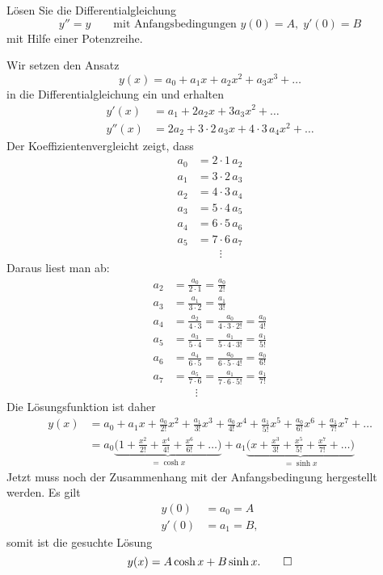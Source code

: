 Lösen Sie die Differentialgleichung
\[
y''=y\qquad\text{mit Anfangsbedingungen $y(0)=A,\;y'(0)=B$}
\]
mit Hilfe einer Potenzreihe.

\begin{loesung}
Wir setzen den Ansatz
\[
y(x)
=
a_0+a_1x+a_2x^2+a_3x^3+\dots
\]
in die Differentialgleichung ein und erhalten
\begin{align*}
y'(x)
&=
a_1+2a_2x+3a_3x^2+\dots
\\
y''(x)
&=
2a_2 + 3\cdot 2\,a_3x + 4\cdot 3\,a_4x^2+\dots
\end{align*}
Der Koeffizientenvergleicht zeigt, dass 
\begin{align*}
a_0&=2\cdot 1\,a_2\\
a_1&=3\cdot 2\,a_3\\
a_2&=4\cdot 3\,a_4\\
a_3&=5\cdot 4\,a_5\\
a_4&=6\cdot 5\,a_6\\
a_5&=7\cdot 6\,a_7\\
   &\qquad\vdots
\end{align*}
Daraus liest man ab:
\begin{align*}
a_2&=\frac{a_0}{2\cdot 1}=\frac{a_0}{2!}\\
a_3&=\frac{a_1}{3\cdot 2}=\frac{a_1}{3!}\\
a_4&=\frac{a_2}{4\cdot 3}=\frac{a_0}{4\cdot 3\cdot 2!}=\frac{a_0}{4!}\\
a_5&=\frac{a_3}{5\cdot 4}=\frac{a_1}{5\cdot 4\cdot 3!}=\frac{a_1}{5!}\\
a_6&=\frac{a_4}{6\cdot 5}=\frac{a_0}{6\cdot 5\cdot 4!}=\frac{a_0}{6!}\\
a_7&=\frac{a_5}{7\cdot 6}=\frac{a_1}{7\cdot 6\cdot 5!}=\frac{a_1}{7!}\\
   &\qquad\vdots
\end{align*}
Die Lösungsfunktion ist daher
\begin{align*}
y(x)
&=
a_0 + a_1x + \frac{a_0}{2!}x^2 + \frac{a_1}{3!}x^3+\frac{a_0}{4!}x^4
+ \frac{a_1}{5!}x^5+\frac{a_0}{6!}x^6 + \frac{a_1}{7!}x^7+\dots
\\
&=
a_0\underbrace{\biggl(
1+\frac{x^2}{2!}+\frac{x^4}{4!}+\frac{x^6}{6!}+\dots
\biggr)}_{\displaystyle =\cosh x} + a_1\underbrace{\biggl(
x+\frac{x^3}{3!}+\frac{x^5}{5!}+\frac{x^7}{7!}+\dots
\biggr)}_{\displaystyle=\sinh x}
\end{align*}
Jetzt muss noch der Zusammenhang mit der Anfangsbedingung hergestellt werden.
Es gilt
\begin{align*}
y(0)  &= a_0 = A\\
y'(0) &= a_1 = B,
\end{align*}
somit ist die gesuchte Lösung
\[
y(x) = A\cosh x + B\sinh x.
\qedhere
\]
\end{loesung}

